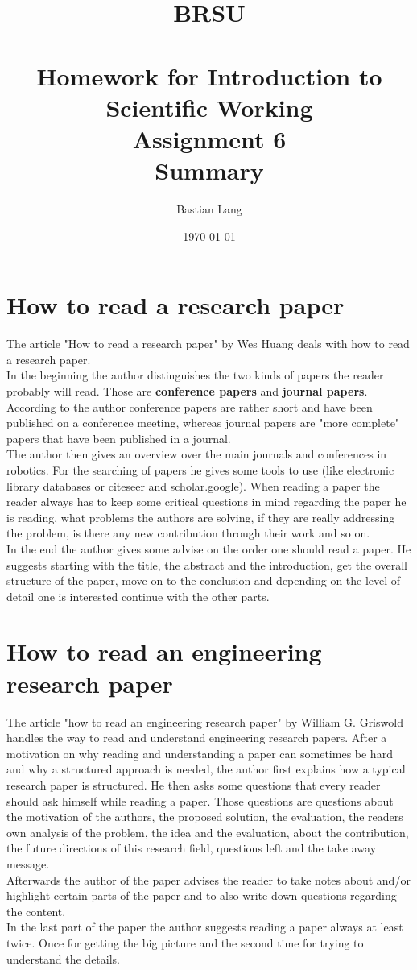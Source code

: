 \documentclass[paper=a4, fontsize=11pt]{scrartcl} %
\title{	
\normalfont \normalsize 
\textsc{BRSU} \\ [25pt] %
\horrule{0.5pt} \\[0.4cm] %
\huge Homework for Introduction to Scientific Working\\Assignment 6\\Summary %
\horrule{2pt} \\[0.5cm] %
}
\author{Bastian Lang} %
\date{\normalsize\today} %
\numberwithin{equation}{section} %
\numberwithin{figure}{section} %
\numberwithin{table}{section} %
\begin{document}
\maketitle %
\newpage

\section{How to read a research paper}
The article "How to read a research paper" by Wes Huang deals with how to read a research paper.\\
In the beginning the author distinguishes the two kinds of papers the reader probably will read. Those are \textbf{conference papers} and \textbf{journal papers}. According to the author conference papers are rather short and have been published on a conference meeting, whereas journal papers are "more complete" papers that have been published in a journal.\\
The author then gives an overview over the main journals and conferences in robotics. For the searching of papers he gives some tools to use (like electronic library databases or citeseer and scholar.google). When reading a paper the reader always has to keep some critical questions in mind regarding the paper he is reading, what problems the authors are solving, if they are really addressing the problem, is there any new contribution through their work and so on.\\
In the end the author gives some advise on the order one should read a paper. He suggests starting with the title, the abstract and the introduction, get the overall structure of the paper, move on to the conclusion and depending on the level of detail one is interested continue with the other parts.

\section{How to read an engineering research paper}
The article "how to read an engineering research paper" by William G. Griswold handles the way to read and understand engineering research papers. After a motivation on why reading and understanding a paper can sometimes be hard and why a structured approach is needed, the author first explains how a typical research paper is structured. He then asks some questions that every reader should ask himself while reading a paper. Those questions are questions about the motivation of the authors, the proposed solution, the evaluation, the readers own analysis of the problem, the idea and the evaluation, about the contribution, the future directions of this research field, questions left and the take away message.\\
Afterwards the author of the paper advises the reader to take notes about and/or highlight certain parts of the paper and to also write down questions regarding the content.\\
In the last part of the paper the author suggests reading a paper always at least twice. Once for getting the big picture and the second time for trying to understand the details. 
\end{document}
